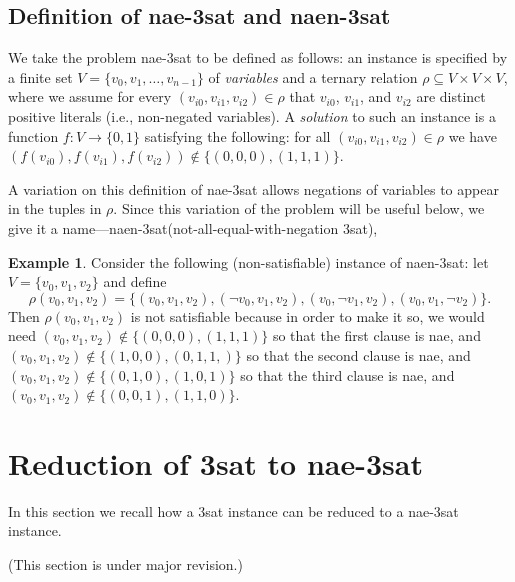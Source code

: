 \documentclass[12pt]{amsart}
\numberwithin{equation}{section}
\theoremstyle{plain}
\theoremstyle{definition}
\newtheorem{example}[theorem]{Example}
\newcommand{\sat}{\acs{sat}\xspace}
\newcommand{\nae}{\acs{nae}\xspace}
\newcommand{\naen}{\acs{naen}\xspace}
\begin{document}
\subsection{Definition of \nae-3\sat and \naen-3\sat}
We take the problem \nae-3\sat to be defined as follows:
an instance is specified by a finite set $V = \{v_0, v_1, \dots, v_{n-1}\}$ of
\emph{variables} and a ternary relation
$\rho \subseteq V \times V \times V$, where 
we assume
for every $(v_{i0}, v_{i1}, v_{i2}) \in \rho$ 
that $v_{i0}$, $v_{i1}$,  and $v_{i2}$ are distinct positive literals
(i.e., non-negated variables).
A \emph{solution} to such an instance %
is a function $f: V \to \{0,1\}$
satisfying the following:
for all $(v_{i0}, v_{i1}, v_{i2}) \in \rho$ we have
$(f(v_{i0}), f(v_{i1}), f(v_{i2})) \notin \{(0,0,0), (1,1,1)\}$.


A variation on this definition of \nae-3\sat allows
negations of variables to appear in the tuples in $\rho$.
Since this variation of the problem will be useful below, we give it a
name---\naen-3\sat (not-all-equal-with-negation 3\sat),

\begin{example}
Consider the following (non-satisfiable)
instance of \naen-3\sat:
let $V= \{v_0, v_1, v_2\}$ and define
\[
\rho(v_0, v_1, v_2) =
\{(v_0, v_1, v_2), (\neg v_0, v_1, v_2), (v_0, \neg v_1, v_2), (v_0,
v_1, \neg v_2)\}.
\]
Then $\rho(v_0, v_1, v_2)$ is not satisfiable because in order to make
it so, we would need
$(v_0, v_1, v_2) \notin \{ (0,0,0), (1,1,1)\}$ so that the
first clause is \nae, and $(v_0, v_1, v_2) \notin \{(1,0,0), (0,1,1,)\}$
so that the second clause is \nae, and 
$(v_0, v_1, v_2) \notin \{ (0,1,0), (1,0,1)\}$ so that the third
clause is \nae, and $(v_0, v_1, v_2) \notin \{(0,0,1), (1,1,0)\}$.
\end{example}


\section{Reduction of 3\sat to \nae-3\sat}
In this section we recall how a 3\sat instance can be reduced to a
\nae-3\sat instance.

\vskip5mm
(This section is under major revision.)

\end{document}
